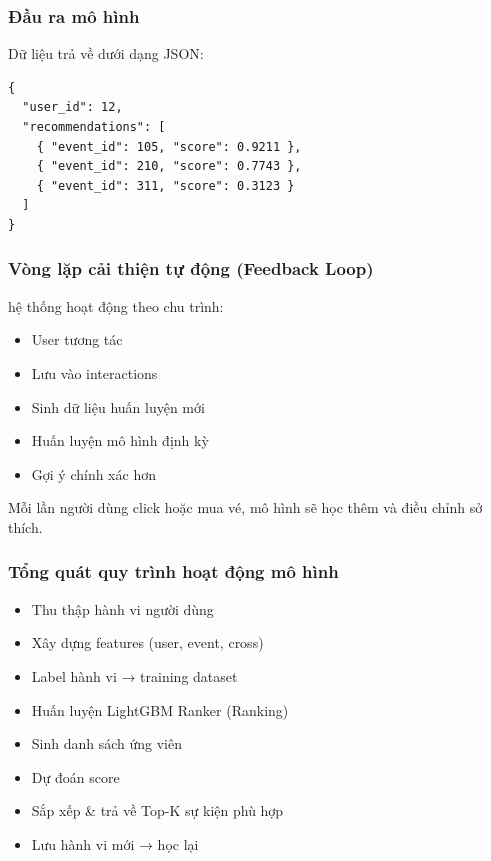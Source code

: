 \subsubsection{Đầu ra mô hình}
\indent \indent Dữ liệu trả về dưới dạng JSON:
\begin{lstlisting}
{
  "user_id": 12,
  "recommendations": [
    { "event_id": 105, "score": 0.9211 },
    { "event_id": 210, "score": 0.7743 },
    { "event_id": 311, "score": 0.3123 }
  ]
}
\end{lstlisting}


\subsubsection{Vòng lặp cải thiện tự động (Feedback Loop)}
\indent \indent hệ thống hoạt động theo chu trình:
\begin{itemize}
    \item[1.] User tương tác
    \item[2.] Lưu vào interactions
    \item[3.] Sinh dữ liệu huấn luyện mới
    \item[4.] Huấn luyện mô hình định kỳ
    \item[5.] Gợi ý chính xác hơn
\end{itemize}
\indent \indent Mỗi lần người dùng click hoặc mua vé, mô hình sẽ học thêm và điều chỉnh sở thích.
\subsubsection{Tổng quát quy trình hoạt động mô hình}
\begin{itemize}
    \item[1.] Thu thập hành vi người dùng
    \item[2.] Xây dựng features (user, event, cross)
    \item[3.] Label hành vi → training dataset
    \item[4.] Huấn luyện LightGBM Ranker (Ranking)
    \item[5.] Sinh danh sách ứng viên
    \item[6.] Dự đoán score
    \item[7.] Sắp xếp \& trả về Top-K sự kiện phù hợp
    \item[8.] Lưu hành vi mới → học lại
\end{itemize}
